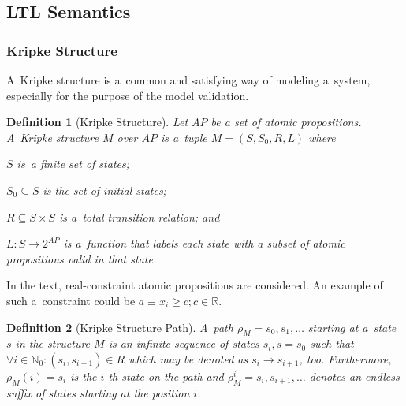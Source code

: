 \documentclass[12pt,oneside,draft]{fithesis}
\newcommand{\mReal}{\mathbb{R}}
\newcommand{\mNatural}{\mathbb{N}}
\newtheorem{mydef}{Definition}
\begin{document}
\subsection{LTL Semantics}
\subsubsection*{Kripke Structure}
A~Kripke structure is a~common and satisfying way of modeling a~system,
especially for the purpose of the model validation\cite{clarke}.
\begin{mydef}[Kripke Structure]
Let ${AP}$ be a set of atomic propositions.
A~Kripke structure\cite{clarke} $M$ over $AP$ is a~tuple
$M=(S, S_0, R, L)$ where
\begin{inparaenum}
	\item{}$S$ is~a finite set of states;
	\item{}$S_0\subseteq{}S$ is the set of initial states;
	\item{}$R\subseteq{}S\times{}S$ is a~total transition relation; and
	\item{}$L:S\rightarrow{}2^{AP}$ is a~function that labels each state
		with a subset of atomic propositions valid in that state.
\end{inparaenum}
\end{mydef}
In the text, real-constraint atomic propositions are considered.
An example of such a~constraint could be
$a\equiv x_i \geq c;c\in\mReal$.

\begin{mydef}[Kripke Structure Path]
A~path\cite{biere} $\rho_M=s_0,s_1,\dotsc$ starting at a~state
$s$ in the structure $M$ is an infinite sequence of states
$s_i, s = s_0$ such that
$\forall i \in \mNatural_0: (s_i, s_{i+1}) \in R$ which may be denoted
as $s_i\rightarrow s_{i+1}$, too. 
Furthermore, $\rho_M(i)=s_i$ is the $i$-th state on the path and
$\rho_M^i=s_i,s_{i+1},\dotsc$ denotes an endless suffix of states
starting at the position $i$.
\end{mydef}
\end{document}
